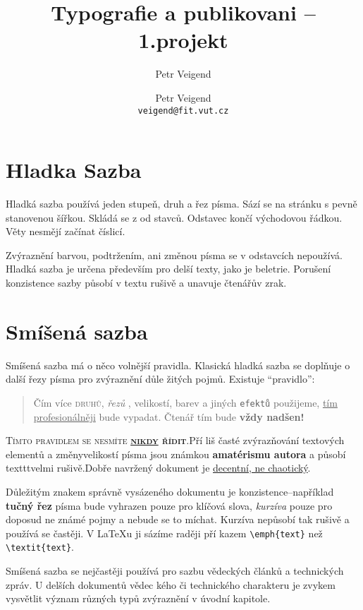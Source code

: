 \documentclass[twocolumn, 10pt, a4paper]{article}
\title{Typografie a publikovani -- 1.projekt}
\author{Petr Veigend}
\author{Petr Veigend \\ \texttt{veigend@fit.vut.cz}}
\begin{document}
\maketitle
\section{Hladka Sazba}
Hladká sazba používá jeden stupeň, druh a řez písma. Sází
se na stránku s pevně stanovenou šířkou. Skládá se z od\-
stavců. Odstavec končí východovou řádkou. Věty nesmějí
začínat číslicí.

Zvýraznění barvou, podtržením, ani změnou písma se
v odstavcích nepoužívá. Hladká sazba je určena především
pro delší texty, jako je beletrie. Porušení konzistence sazby
působí v textu rušivě a unavuje čtenářův zrak.
\section{Smíšená sazba}
 Smíšená sazba má o něco volnější pravidla. Klasická hladká
sazba se doplňuje o další řezy písma pro zvýraznění důle\-
žitých pojmů. Existuje \enquote{pravidlo}:
\begin{quotation}
    Čím více \textsc{druhů}, \textit{řezů }, {\tiny velikostí}, \textcolor[rgb]{0, 1, 0.098}{barev}
    a jiných \texttt{efektů} použijeme, \uline{tím profesionálněji}
bude {\selectfont{dokument} }vypadat. Čtenář tím bude {\Large \textbf{vždy
    nadšen!}}
\end{quotation}
\textsc{Tímto pravidlem se nesmíte \textbf{\uline{nikdy} řídit}}.Pří\-
liš časté zvýrazňování textových elementů a změny{\tiny velikostí}
písma jsou známkou \textbf{amatérismu autora} a působí texttt{velmi
rušivě.}Dobře navržený dokument je
\uline{decentní, ne chaotický}.

Důležitým znakem správně vysázeného dokumentu je
konzistence--například \textbf{tučný řez} písma bude vyhrazen
pouze pro klíčová slova, \textit{kurzíva} pouze pro doposud ne\-
známé pojmy a nebude se to míchat. Kurzíva nepůsobí tak
rušivě a používá se častěji. V \LaTeX u ji sázíme raději pří\-
kazem \verb|\emph{text}| než \verb|\textit{text}|.

Smíšená sazba se nejčastěji používá pro sazbu vědeckých
článků a technických zpráv. U delších dokumentů vědec\-
kého či technického charakteru je zvykem vysvětlit význam
různých typů zvýraznění v úvodní kapitole.
\end{document}
